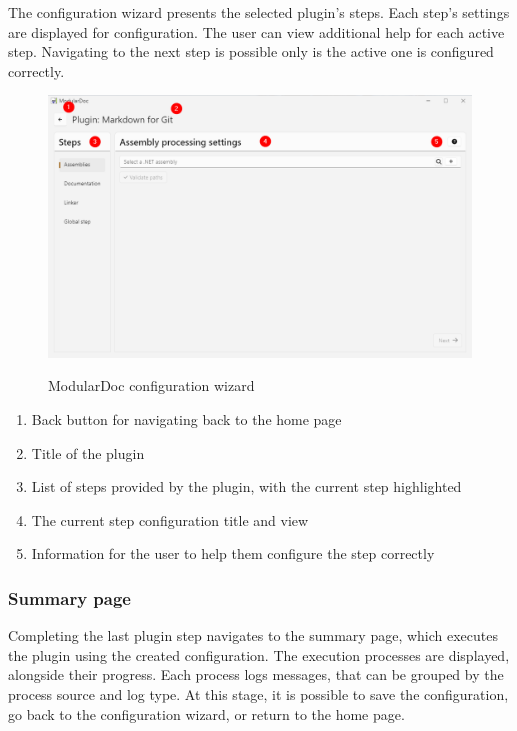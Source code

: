 The configuration wizard presents the selected plugin's steps. Each step's settings are displayed for configuration. The user can view additional help for each active step. Navigating to the next step is possible only is the active one is configured correctly.

\begin{figure}[H]
    \includegraphics[width=\linewidth]{img/modularDocConfigurator.png}
    \label{fig:modularDocconfiguratorPage}
    \caption{ModularDoc configuration wizard}
\end{figure}

\begin{enumerate}
    \item Back button for navigating back to the home page
    \item Title of the plugin
    \item List of steps provided by the plugin, with the current step highlighted
    \item The current step configuration title and view
    \item Information for the user to help them configure the step correctly
\end{enumerate}

\pagebreak
\subsubsection{Summary page}

Completing the last plugin step navigates to the summary page, which executes the plugin using the created configuration. The execution processes are displayed, alongside their progress. Each process logs messages, that can be grouped by the process source and log type. At this stage, it is possible to save the configuration, go back to the configuration wizard, or return to the home page.

